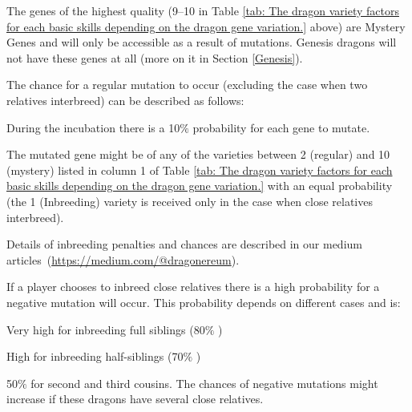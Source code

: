 \documentclass[12pt]{article}
\begin{document}
The genes of the highest quality (9–10 in  Table \ref{tab: The dragon variety factors for each basic skills depending on the dragon gene variation.} above) are Mystery Genes and will only be accessible as a result of mutations. Genesis dragons will not have these genes at all (more on it in Section \ref{Genesis}).\par

The chance for a regular mutation to occur (excluding the case when two relatives interbreed) can be described as follows:\par

\begin{itemize}
  \begin{samepage}
	\item During the incubation there is a 10$\%$  probability for each gene to mutate.\par

	\item The mutated gene might be of any of the varieties between 2 (regular) and 10 (mystery) listed in column 1 of  Table \ref{tab: The dragon variety factors for each basic skills depending on the dragon gene variation.} with an equal probability (the 1 (Inbreeding) variety is received only in the case when close relatives interbreed).\par
  \end{samepage}
\end{itemize}

Details of inbreeding penalties and chances are described in our medium  \mbox{articles (\url{https://medium.com/@dragonereum})}. \par

If a player chooses to inbreed close relatives there is a high probability for a negative mutation will occur. This probability depends on different cases and is:\par

\begin{itemize}
  \begin{samepage}
	\item Very high for inbreeding full siblings (80$\%$ )\par

	\item High for inbreeding half-siblings (70$\%$ )\par

	\item 50$\%$  for second and third cousins. The chances of negative mutations might increase if these dragons have several close relatives. 
  \end{samepage}
\end{itemize}\par
\end{document}
